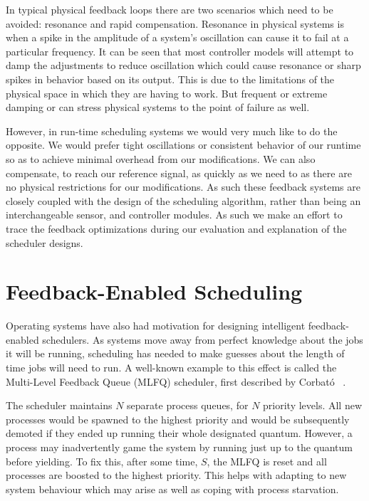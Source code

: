 In typical physical feedback loops there are two scenarios which need to be 
avoided: resonance and rapid compensation. Resonance in physical systems is 
when a spike in the amplitude of a system's oscillation can cause it to fail at 
a particular frequency. It can be seen that most controller 
models will attempt to damp the adjustments to reduce oscillation which could 
cause resonance or sharp spikes in behavior based on its output. This is due to 
the limitations of the physical space in which they are having to work. But 
frequent or extreme damping or can stress physical systems to the point of
failure as well.

However, in run-time scheduling systems we would very much like to do the 
opposite. We would prefer tight oscillations or consistent behavior of our 
runtime so as to achieve minimal overhead from our modifications. We can also 
compensate, to reach our reference signal, as quickly as we need to as there 
are no physical restrictions for our modifications.
As such these feedback systems are closely coupled with the design of the 
scheduling algorithm, rather than being an interchangeable sensor, and controller
modules. As such we make an effort to trace the feedback optimizations during
our evaluation and explanation of the scheduler designs.


\section{Feedback-Enabled Scheduling}

Operating systems have also had motivation for designing intelligent 
feedback-enabled schedulers. As systems move away from perfect knowledge about 
the jobs it will be running, scheduling has needed to make guesses about the 
length of time jobs will need to run. A well-known example to this effect is
called the Multi-Level Feedback Queue (MLFQ) scheduler, first described by 
Corbat{\'o} \etal~\cite{corbato1962experimental,ArpaciDusseau14Book}.

The scheduler maintains $N$ separate process queues, for $N$ priority levels. 
All new processes would be spawned to the highest priority and would be 
subsequently demoted if they ended up running their whole designated quantum. 
However, a process may inadvertently game the system by running just up to the
quantum before yielding. To fix this, after some time, $S$, the MLFQ is reset 
and all processes are boosted to the highest priority. This helps with adapting 
to new system behaviour which may arise as well as coping with process 
starvation.

